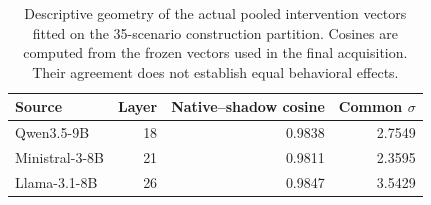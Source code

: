 \begin{table}[t]
\centering\scriptsize\setlength{\tabcolsep}{3pt}
\begin{tabular}{lrrr}
\toprule
Source & Layer & Native--shadow cosine & Common $\sigma$ \\
\midrule
Qwen3.5-9B & 18 & 0.9838 & 2.7549 \\
Ministral-3-8B & 21 & 0.9811 & 2.3595 \\
Llama-3.1-8B & 26 & 0.9847 & 3.5429 \\
\bottomrule
\end{tabular}
\caption{Descriptive geometry of the actual pooled intervention vectors fitted on the 35-scenario construction partition. Cosines are computed from the frozen vectors used in the final acquisition. Their agreement does not establish equal behavioral effects.}
\label{tab:current-geometry}
\end{table}
